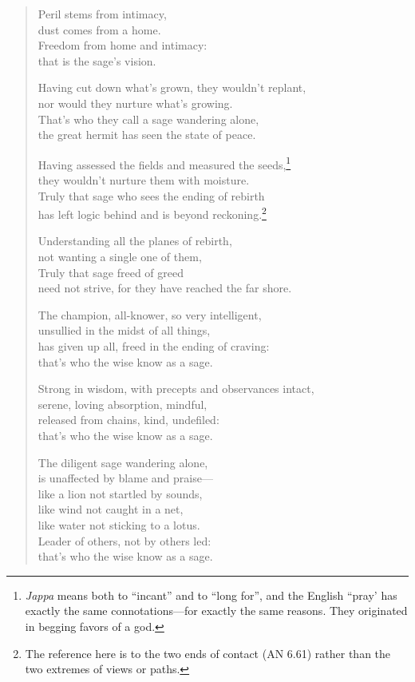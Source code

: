 \documentclass[12pt,openany]{book}%
\begin{document}
\begin{verse}%
Peril stems from intimacy, \\
dust comes from a home. \\
Freedom from home and intimacy: \\
that is the sage’s vision. 

Having cut down what’s grown, they wouldn’t replant, \\
nor would they nurture what’s growing. \\
That’s who they call a sage wandering alone, \\
the great hermit has seen the state of peace. 

Having assessed the fields and measured the seeds,\footnote{\textit{Jappa} means both to “incant” and to “long for”, and the English “pray’ has exactly the same connotations—for exactly the same reasons. They originated in begging favors of a god. } \\
they wouldn’t nurture them with moisture. \\
Truly that sage who sees the ending of rebirth \\
has left logic behind and is beyond reckoning.\footnote{The reference here is to the two ends of contact (AN 6.61) rather than the two extremes of views or paths. } 

Understanding all the planes of rebirth, \\
not wanting a single one of them, \\
Truly that sage freed of greed \\
need not strive, for they have reached the far shore. 

The champion, all-knower, so very intelligent, \\
unsullied in the midst of all things, \\
has given up all, freed in the ending of craving: \\
that’s who the wise know as a sage. 

Strong in wisdom, with precepts and observances intact, \\
serene, loving absorption, mindful, \\
released from chains, kind, undefiled: \\
that’s who the wise know as a sage. 

The diligent sage wandering alone, \\
is unaffected by blame and praise—\\
like a lion not startled by sounds, \\
like wind not caught in a net, \\
like water not sticking to a lotus. \\
Leader of others, not by others led: \\
that’s who the wise know as a sage. 


\end{verse}
\end{document}
